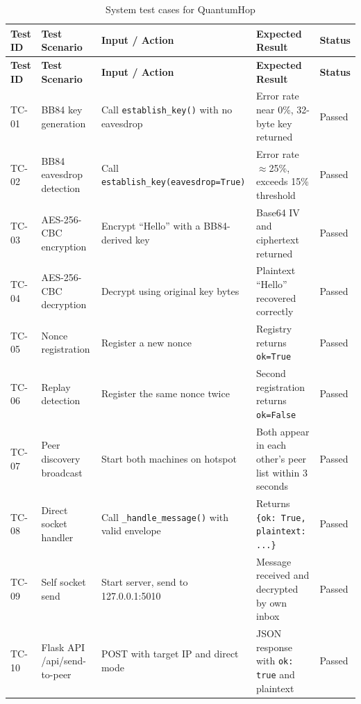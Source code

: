 \begin{longtable}{|p{1.2cm}|p{3.4cm}|p{4.0cm}|p{4.0cm}|p{1.8cm}|}
\caption{System test cases for QuantumHop}\label{tab:system-test-cases}\\
\hline
\textbf{Test ID} & \textbf{Test Scenario} & \textbf{Input / Action} & \textbf{Expected Result} & \textbf{Status} \\
\hline
\endfirsthead

\hline
\textbf{Test ID} & \textbf{Test Scenario} & \textbf{Input / Action} & \textbf{Expected Result} & \textbf{Status} \\
\hline
\endhead

TC-01 & BB84 key generation & Call \texttt{establish\_key()} with no eavesdrop & Error rate near 0\%, 32-byte key returned & Passed \\
\hline

TC-02 & BB84 eavesdrop detection & Call \texttt{establish\_key(eavesdrop=True)} & Error rate $\approx$25\%, exceeds 15\% threshold & Passed \\
\hline

TC-03 & AES-256-CBC encryption & Encrypt ``Hello'' with a BB84-derived key & Base64 IV and ciphertext returned & Passed \\
\hline

TC-04 & AES-256-CBC decryption & Decrypt using original key bytes & Plaintext ``Hello'' recovered correctly & Passed \\
\hline

TC-05 & Nonce registration & Register a new nonce & Registry returns \texttt{ok=True} & Passed \\
\hline

TC-06 & Replay detection & Register the same nonce twice & Second registration returns \texttt{ok=False} & Passed \\
\hline

TC-07 & Peer discovery broadcast & Start both machines on hotspot & Both appear in each other's peer list within 3 seconds & Passed \\
\hline

TC-08 & Direct socket handler & Call \texttt{\_handle\_message()} with valid envelope & Returns \texttt{\{ok: True, plaintext: ...\}} & Passed \\
\hline

TC-09 & Self socket send & Start server, send to 127.0.0.1:5010 & Message received and decrypted by own inbox & Passed \\
\hline

TC-10 & Flask API /api/send-to-peer & POST with target IP and direct mode & JSON response with \texttt{ok: true} and plaintext & Passed \\
\hline


\end{longtable}
